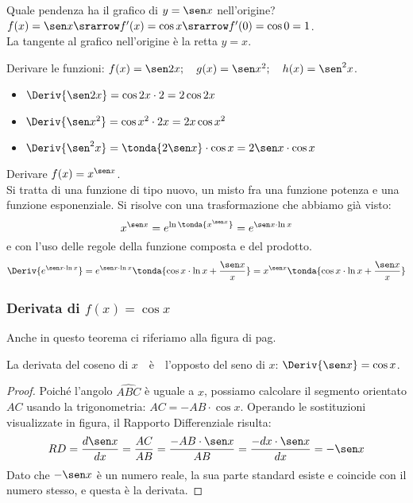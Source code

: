 \begin{esempio}
Quale pendenza ha il grafico di \(y=\sen x\) nell'origine?\\
\(f(x)= \sen x \srarrow f'(x)=\cos x\srarrow f'(0)=\cos 0=1\).\\
La tangente al grafico nell'origine è la retta \(y=x\).
\end{esempio}

\begin{esempio}
Derivare le funzioni: 
\(f(x)=\sen 2x; \quad g(x)= \sen x^2; \quad h(x) = \sen^2 x\).
\begin{itemize}
\item \(\Deriv{\sen 2x} = \cos 2x \cdot 2 = 2 \cos 2x\)
\item \(\Deriv{\sen x^2} = \cos x^2 \cdot 2x = 2x \cos x^2\)
\item \(\Deriv{\sen^2 x} = \tonda{2 \sen x} \cdot \cos x = 
                           2 \sen x \cdot \cos x\)
\end{itemize}
\end{esempio}

\begin{esempio}
Derivare \(f(x)=x^{\sen x}\).\\
Si tratta di una funzione di tipo nuovo, un misto fra una funzione potenza
e una funzione esponenziale. Si risolve con una trasformazione che abbiamo
già visto:
\[x^{\sen x}=e^{\ln \tonda{x^{\sen x}}}=e^{\sen x \cdot \ln x}\]
e con l'uso delle regole della funzione composta e del prodotto.
\[\Deriv{e^{\sen x \cdot \ln x}}=
  e^{\sen x \cdot \ln x}\tonda{\cos x \cdot \ln x +\dfrac{\sen x}{x}}=
  x^{\sen x}\tonda{\cos x \cdot \ln x +\dfrac{\sen x}{x}}\]
\end{esempio}

\subsubsection{Derivata di \(f(x)=\cos x\)}
Anche in questo teorema ci riferiamo alla 
figura di pag.\pageref{fig:differenziazione_dsincos}
\begin{teorema}
La derivata del coseno di \(x\)~~è~~l'opposto del seno di \(x\): \quad 
\(\Deriv{\sen x} = \cos x\).
\end{teorema}
\begin{proof}
Poiché l'angolo \(\widehat{ABC}\) è uguale a \(x\), possiamo calcolare 
il segmento orientato \(AC\) usando la trigonometria: 
\quad \(AC = - AB \cdot \cos x\). 
Operando le sostituzioni visualizzate in figura, il Rapporto Differenziale 
risulta:
\[RD = \dfrac{d \sen x}{dx} = \dfrac{AC}{AB} = 
       \dfrac{-AB \cdot \sen x}{AB} = 
       \dfrac{-dx \cdot \sen x}{dx} = -\sen x\]
Dato che \(-\sen x\) è un numero reale, la sua parte standard esiste e 
coincide con il numero stesso, e questa è la derivata.
\end{proof}

